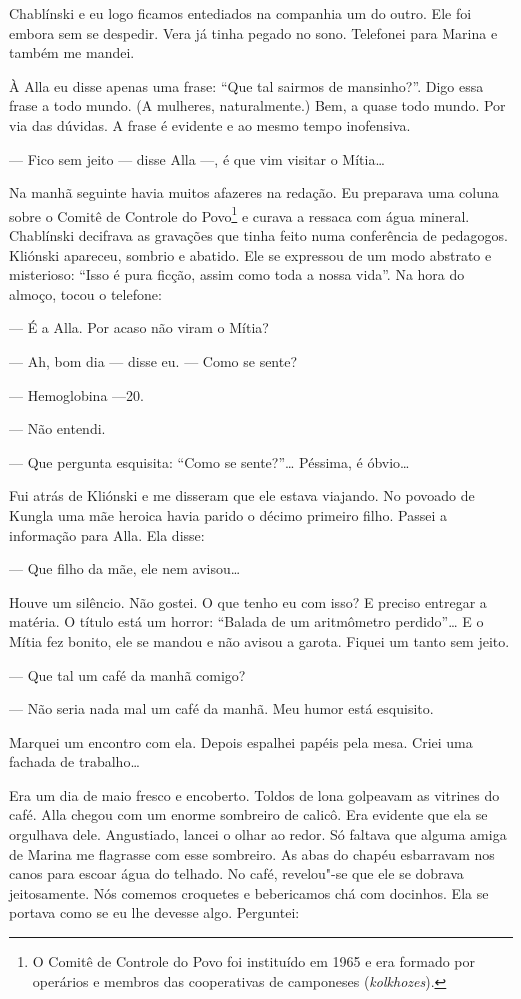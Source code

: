 Chablínski e eu logo ficamos entediados na companhia um do outro. Ele
foi embora sem se despedir. Vera já tinha pegado no sono. Telefonei para
Marina e também me mandei.

À Alla eu disse apenas uma frase: ``Que tal sairmos de mansinho?''. Digo
essa frase a todo mundo. (A mulheres, naturalmente.) Bem, a quase todo
mundo. Por via das dúvidas. A frase é evidente e ao mesmo tempo
inofensiva.

--- Fico sem jeito --- disse Alla ---, é que vim visitar o Mítia\ldots{}

Na manhã seguinte havia muitos afazeres na redação. Eu preparava uma
coluna sobre o Comitê de Controle do Povo\footnote{O Comitê de Controle
  do Povo foi instituído em 1965 e era formado por operários e membros
  das cooperativas de camponeses (\emph{kolkhozes}).} e curava a ressaca
com água mineral. Chablínski decifrava as gravações que tinha feito numa
conferência de pedagogos. Kliónski apareceu, sombrio e abatido. Ele se
expressou de um modo abstrato e misterioso: ``Isso é pura ficção, assim
como toda a nossa vida''. Na hora do almoço, tocou o telefone:

--- É a Alla. Por acaso não viram o Mítia?

--- Ah, bom dia --- disse eu. --- Como se sente?

--- Hemoglobina ---20.

--- Não entendi.

--- Que pergunta esquisita: ``Como se sente?''\ldots{} Péssima, é óbvio\ldots{}

Fui atrás de Kliónski e me disseram que ele estava viajando. No povoado
de Kungla uma mãe heroica havia parido o décimo primeiro filho. Passei a
informação para Alla. Ela disse:

--- Que filho da mãe, ele nem avisou\ldots{}

Houve um silêncio. Não gostei. O que tenho eu com isso? E preciso
entregar a matéria. O título está um horror: ``Balada de um aritmômetro
perdido''\ldots{} E o Mítia fez bonito, ele se mandou e não avisou a garota.
Fiquei um tanto sem jeito.

--- Que tal um café da manhã comigo?

--- Não seria nada mal um café da manhã. Meu humor está esquisito.

Marquei um encontro com ela. Depois espalhei papéis pela mesa. Criei uma
fachada de trabalho\ldots{}

Era um dia de maio fresco e encoberto. Toldos de lona golpeavam as
vitrines do café. Alla chegou com um enorme sombreiro de calicô. Era
evidente que ela se orgulhava dele. Angustiado, lancei o olhar ao redor.
Só faltava que alguma amiga de Marina me flagrasse com esse sombreiro.
As abas do chapéu esbarravam nos canos para escoar água do telhado. No
café, revelou"-se que ele se dobrava jeitosamente. Nós comemos croquetes
e bebericamos chá com docinhos. Ela se portava como se eu lhe devesse
algo. Perguntei:

